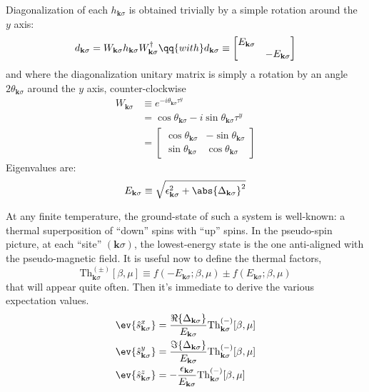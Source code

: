 Diagonalization of each $h_{\mathbf{k}\sigma}$ is obtained trivially by a simple rotation around the $y$ axis:
\[
	d_{\mathbf{k}\sigma} = W_{\mathbf{k}\sigma} h_{\mathbf{k}\sigma} W_{\mathbf{k}\sigma}^\dagger
	\qq{with}
	d_{\mathbf{k}\sigma} \equiv \begin{bmatrix}
		E_{\mathbf{k}\sigma} & \\
		& - E_{\mathbf{k}\sigma}
	\end{bmatrix}
\]
and where the diagonalization unitary matrix is simply a rotation by an angle $2 \theta_{\mathbf{k}\sigma}$ around the $y$ axis, counter-clockwise
\begin{align}
	W_{\mathbf{k}\sigma} &\equiv e^{-i \theta_{\mathbf{k}\sigma} \tau^y} \nonumber\\
	&= \cos \theta_{\mathbf{k}\sigma} -i \sin \theta_{\mathbf{k}\sigma} \tau^y \nonumber\\
	&= \begin{bmatrix}
		\cos \theta_{\mathbf{k}\sigma} & - \sin \theta_{\mathbf{k}\sigma} \\
		\sin \theta_{\mathbf{k}\sigma} & \cos \theta_{\mathbf{k}\sigma}
	\end{bmatrix} \label{appeq:af-hm-diagonalizer}
\end{align}
Eigenvalues are:
\begin{equation}\label{appeq:af-bands}
	E_{\mathbf{k}\sigma} \equiv \sqrt{
		\epsilon_{\mathbf{k}\sigma}^2 + \abs{\Delta_{\mathbf{k}\sigma}}^2
	}
\end{equation}

At any finite temperature, the ground-state of such a system is well-known: a thermal superposition of ``down'' spins with ``up'' spins. In the pseudo-spin picture, at each ``site'' $(\mathbf{k}\sigma)$, the lowest-energy state is the one anti-aligned with the pseudo-magnetic field. It is useful now to define the thermal factors,
\begin{equation}\label{appeq:af-thermal-factors-def}
	\mathrm{Th}_{\mathbf{k}\sigma}^{(\pm)}[\beta,\mu] \equiv 
	f\left(
		-E_{\mathbf{k}\sigma};\beta,\mu
	\right) \pm f\left(
		E_{\mathbf{k}\sigma};\beta,\mu
	\right)
\end{equation}
that will appear quite often. Then it's immediate to derive the various expectation values.
\begin{align}
	\ev{\hat s_{\mathbf{k}\sigma}^x} &= \frac{\Re\lbrace\Delta_{\mathbf{k}\sigma}\rbrace}{E_{\mathbf{k}\sigma}} \mathrm{Th}_{\mathbf{k}\sigma}^{(-)}[\beta,\mu] \label{appeq:af-hm-sx}\\
	\ev{\hat s_{\mathbf{k}\sigma}^y} &= \frac{\Im\lbrace\Delta_{\mathbf{k}\sigma}\rbrace}{E_{\mathbf{k}\sigma}}  \mathrm{Th}_{\mathbf{k}\sigma}^{(-)}[\beta,\mu] \label{appeq:af-hm-sy}\\
	\ev{\hat s_{\mathbf{k}\sigma}^z} &=  -\frac{\epsilon_{\mathbf{k}\sigma}}{E_{\mathbf{k}\sigma}}  \mathrm{Th}_{\mathbf{k}\sigma}^{(-)}[\beta,\mu] \label{appeq:af-hm-sz}
\end{align}

